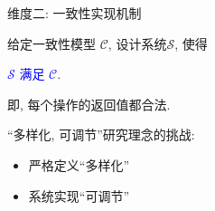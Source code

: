 % 
% 
% 
\begin{frame}{维度二: 一致性实现机制}
  \begin{center}
	给定一致性模型 $\mathcal{C}$, 设计系统$\mathcal{S}$, 使得

	\pause
	\vspace{0.30cm}
	\textcolor{blue}{$\mathcal{S}$ 满足 $\mathcal{C}$}.

	即, 每个操作的返回值都合法.
  \end{center}


  \pause
  \vspace{0.50cm}

  \begin{center}
	``多样化, 可调节''研究理念的挑战:
	\vspace{8pt}
	\begin{itemize}
	  \centering
	  \item 严格定义``多样化''
	  \item 系统实现``可调节''
	\end{itemize}
  \end{center}
\end{frame}
